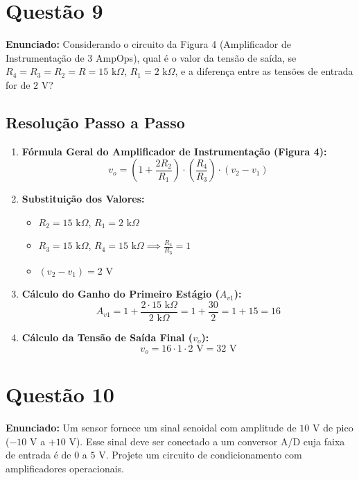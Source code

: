 \newpage

\section*{Questão 9}
\textbf{Enunciado:} Considerando o circuito da Figura 4 (Amplificador de Instrumentação de 3 AmpOps), qual é o valor da tensão de saída, se $R_4 = R_3 = R_2 = R = 15\text{ k}\Omega$, $R_1 = 2\text{ k}\Omega$, e a diferença entre as tensões de entrada for de $2\text{ V}$?

\subsection*{Resolução Passo a Passo}
\begin{enumerate}
    \item \textbf{Fórmula Geral do Amplificador de Instrumentação (Figura 4):}
    \begin{equation*}
        v_o = \left( 1 + \frac{2 R_2}{R_1} \right) \cdot \left( \frac{R_4}{R_3} \right) \cdot (v_2 - v_1)
    \end{equation*}

    \item \textbf{Substituição dos Valores:}
    \begin{itemize}
        \item $R_2 = 15\text{ k}\Omega$, $R_1 = 2\text{ k}\Omega$
        \item $R_3 = 15\text{ k}\Omega$, $R_4 = 15\text{ k}\Omega \implies \frac{R_4}{R_3} = 1$
        \item $(v_2 - v_1) = 2\text{ V}$
    \end{itemize}

    \item \textbf{Cálculo do Ganho do Primeiro Estágio ($A_{v1}$):}
    \begin{equation*}
        A_{v1} = 1 + \frac{2 \cdot 15\text{ k}\Omega}{2\text{ k}\Omega} = 1 + \frac{30}{2} = 1 + 15 = 16
    \end{equation*}

    \item \textbf{Cálculo da Tensão de Saída Final ($v_o$):}
    \begin{equation*}
        v_o = 16 \cdot 1 \cdot 2\text{ V} = 32\text{ V}
    \end{equation*}
\end{enumerate}



\section*{Questão 10}
\textbf{Enunciado:} Um sensor fornece um sinal senoidal com amplitude de $10\text{ V}$ de pico ($-10\text{ V}$ a $+10\text{ V}$). Esse sinal deve ser conectado a um conversor A/D cuja faixa de entrada é de $0$ a $5\text{ V}$. Projete um circuito de condicionamento com amplificadores operacionais.

